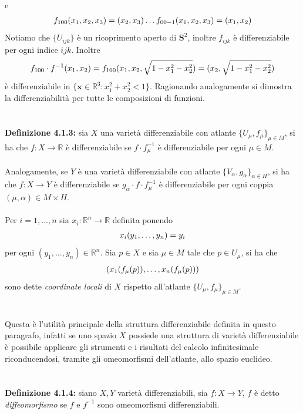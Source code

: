 \documentclass{article}
\begin{document}
e
\begin{gather}
    f_{100}(x_1, x_2, x_3) = (x_2, x_3) \dots f_{00-1}(x_1, x_2, x_3) = (x_1, x_2) \notag
\end{gather}
Notiamo che $\{ U_{ijk} \}$ è un ricoprimento aperto di $\mathbf{S}^2$, inoltre $f_{ijk}$ è differenziabile per ogni indice $ijk$. Inoltre
\begin{gather}
    f_{100} \cdot f^{-1}(x_1, x_2) = f_{100}(x_1, x_2, \sqrt{1 - x^2_1 - x^2_2}) = (x_2, \sqrt{1 - x^2_1 - x^2_2}) \notag
\end{gather}
è differenziabile in $\{ \mathbf{x} \in \mathbb{R}^3 : x^2_1 + x^2_2 < 1 \}$. Ragionando analogamente si dimostra la differenziabilità per tutte le composizioni di funzioni. \\ \\ \\
\textbf{Definizione 4.1.3:} sia $X$ una varietà differenziabile con atlante $\{ U_\mu, f_\mu \}_{\mu \in M}$, si ha che $f : X \longrightarrow \mathbb{R}$ è differenziabile se $f \cdot f^{-1}_\mu$ è differenziabile per ogni $\mu \in M$. \\ \\
Analogamente, se $Y$ è una varietà differenziabile con atlante $\{ V_\alpha, g_\alpha \}_{\alpha \in H}$, si ha che $f : X \longrightarrow Y$ è differenziabile se $g_{\alpha} \cdot f \cdot f^{-1}_\mu$ è differenziabile per ogni coppia $(\mu, \alpha) \in M \times H$. \\ \\
Per $i = 1, \dots, n$ sia $x_i : \mathbb{R}^n \longrightarrow \mathbb{R}$ definita ponendo
\begin{gather}
    x_i(y_1, \dots, y_n) = y_i \notag
\end{gather}
per ogni $(y_1, \dots, y_n) \in \mathbb{R}^n$. Sia $p \in X$ e sia $\mu \in M$ tale che $p \in U_\mu$, si ha che
\begin{gather}
    (x_1(f_\mu(p)), \dots, x_n(f_\mu(p))) \notag
\end{gather}
sono dette \textit{coordinate locali} di $X$ rispetto all'atlante $\{ U_\mu, f_\mu \}_{\mu \in M}$. \\ \\ \\
Questa è l'utilità principale della struttura differenziabile definita in questo paragrafo, infatti se uno spazio $X$ possiede una struttura di varietà differenziabile è possibile applicare gli strumenti e i risultati del calcolo infinitesimale riconducendosi, tramite gli omeomorfismi dell'atlante, allo spazio euclideo. \\ \\ \\
\textbf{Definizione 4.1.4:} siano $X, Y$ varietà differenziabili, sia $f : X \longrightarrow Y$, $f$ è detto \textit{diffeomorfismo} se $f$ e $f^{-1}$ sono omeomorfismi differenziabili.
\end{document}
